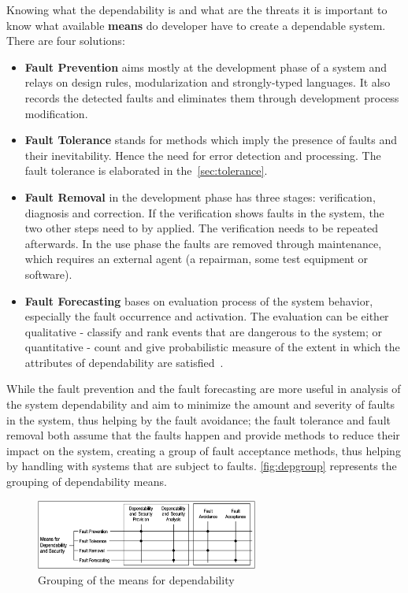 Knowing what the dependability is and what are the threats it is important to know what available \textbf{means} do developer have to create a dependable system. There are four solutions:
\begin{itemize}
    \item \textbf{Fault Prevention} aims mostly at the development phase of a system and relays on design rules, modularization and strongly-typed languages. It also records the detected faults and eliminates them through development process modification.
    \item \textbf{Fault Tolerance} stands for methods which imply the presence of faults and their inevitability. Hence the need for error detection and processing. The fault tolerance is elaborated in the~\autoref{sec:tolerance}.
    \item \textbf{Fault Removal} in the development phase has three stages: verification, diagnosis and correction. If the verification shows faults in the system, the two other steps need to by applied. The verification needs to be repeated afterwards. In the use phase the faults are removed through maintenance, which requires an external agent (a repairman, some test equipment or software).
    \item \textbf{Fault Forecasting} bases on evaluation process of the system behavior, especially the fault occurrence and activation. The evaluation can be either qualitative - classify and rank events that are dangerous to the system; or quantitative - count and give probabilistic measure of the extent in which the attributes of dependability are satisfied~\cite{art:Avizienis, art:Avizienis2}. 
\end{itemize}
While the fault prevention and the fault forecasting are more useful in analysis of the system dependability and aim to minimize the amount and severity of faults in the system, thus helping by the fault avoidance; the fault tolerance and fault removal both assume that the faults happen and provide methods to reduce their impact on the system, creating a group of fault acceptance methods, thus helping by handling with systems that are subject to faults. \autoref{fig:depgroup} represents the grouping of dependability means.

\begin{figure}[H]
\centering
\includegraphics[width=0.65\textwidth]{figures/depgroup.png}
\caption{Grouping of the means for dependability~\cite{art:Avizienis}}
\label{fig:depgroup}
\end{figure}

